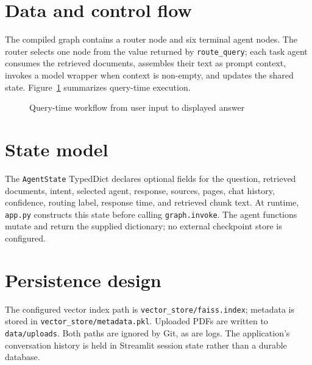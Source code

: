 \section{Data and control flow}
The compiled graph contains a router node and six terminal agent nodes. The router selects one node from the value returned by \texttt{route\_query}; each task agent consumes the retrieved documents, assembles their text as prompt context, invokes a model wrapper when context is non-empty, and updates the shared state. Figure~\ref{fig:query-workflow} summarizes query-time execution.

\begin{figure}[htbp]
\centering
\resizebox{0.98\textwidth}{!}{}
\caption{Query-time workflow from user input to displayed answer}
\label{fig:query-workflow}
\end{figure}

\section{State model}
The \texttt{AgentState} TypedDict declares optional fields for the question, retrieved documents, intent, selected agent, response, sources, pages, chat history, confidence, routing label, response time, and retrieved chunk text. At runtime, \texttt{app.py} constructs this state before calling \texttt{graph.invoke}. The agent functions mutate and return the supplied dictionary; no external checkpoint store is configured.

\section{Persistence design}
The configured vector index path is \texttt{vector\_store/faiss.index}; metadata is stored in \texttt{vector\_store/metadata.pkl}. Uploaded PDFs are written to \texttt{data/uploads}. Both paths are ignored by Git, as are logs. The application's conversation history is held in Streamlit session state rather than a durable database.
